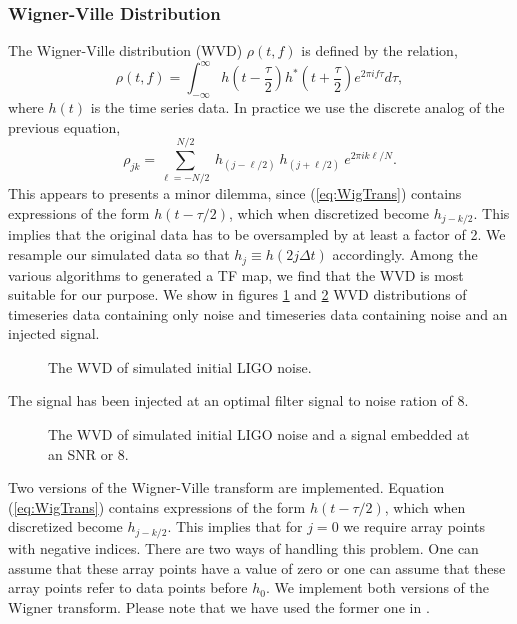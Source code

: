 \subsubsection{Wigner-Ville Distribution}
\label{sss:WVD}
The Wigner-Ville distribution (WVD)  $\rho(t,f)$ is defined by the relation,
\begin{equation}
\label{eq:WigTrans}
\rho(t,f) = \int_{-\infty}^\infty h\left(t - \frac{\tau}{2}\right)
h^*\left(t + \frac{\tau}{2}\right) e^{2\pi i f\tau} d\tau,
\end{equation}
where $h(t)$ is the time series data. In practice we use the discrete
analog of the previous equation, 
\begin{equation}
   \rho_{jk} = \sum_{\ell=-N/2}^{N/2}~h_{(j-\ell/2)}~h_{(j+\ell/2)}
      ~e^{2\pi i k \ell/N}.
\end{equation}
This appears to presents a minor
dilemma, since (\ref{eq:WigTrans}) contains expressions of the form
$h(t-\tau/2)$, which when discretized become $h_{j-k/2}$. 
This implies that the original data has to be oversampled by at least
a  factor of 2. We resample our simulated data so
that $h_j\equiv h(2j\Delta t)$ accordingly. Among the various
algorithms to generated a TF map, we find that the WVD is most
suitable for our purpose. We show in figures \ref{f:wigwithoutsig} and 
\ref{f:wigwithsig} WVD distributions of timeseries data containing 
only noise and  timeseries data containing noise and an injected
signal. 
\begin{figure}[htbp]
\begin{center}
\caption{ \label{f:wigwithoutsig}
The WVD of simulated initial LIGO noise.
 }
\end{center}
\end{figure}
The signal has been injected at an optimal filter signal to
noise ration of 8.

\begin{figure}[htbp]
\begin{center}
\caption{ \label{f:wigwithsig}
The WVD of simulated initial LIGO noise and a signal embedded at an
SNR or 8.
 }
\end{center}
\end{figure}

Two versions of the Wigner-Ville transform are implemented. 
Equation (\ref{eq:WigTrans}) contains expressions of the form
$h(t-\tau/2)$, which when discretized become $h_{j-k/2}$. This implies
that for $j=0$ we require array points with negative indices. There
are two ways of handling this problem. One can assume that these array
points have a value of zero or one can assume that these array points
refer to data points before $h_0$. We implement both versions of the
Wigner transform. Please note that we have used the former one in 
\cite{timefreqpap}.

